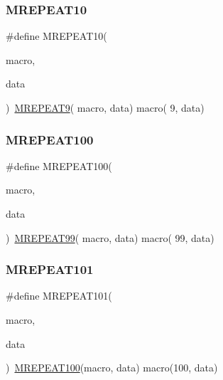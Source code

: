 \mbox{\label{group__group__sam0__utils__mrepeat_gade8cd92280a999cf105148e3fa4c5da9}} 
\subsubsection{\texorpdfstring{MREPEAT10}{MREPEAT10}}
{\footnotesize\ttfamily \#define M\+R\+E\+P\+E\+A\+T10(\begin{DoxyParamCaption}\item[{}]{macro,  }\item[{}]{data }\end{DoxyParamCaption})~\mbox{\hyperlink{group__group__sam0__utils__mrepeat_ga7bd045abdbb4d2c2d1d32e2d65e48b7d}{M\+R\+E\+P\+E\+A\+T9}}(  macro, data)   macro(  9, data)}

\mbox{\label{group__group__sam0__utils__mrepeat_ga2735125552e869ea1e49fa52ed6e175c}} 
\subsubsection{\texorpdfstring{MREPEAT100}{MREPEAT100}}
{\footnotesize\ttfamily \#define M\+R\+E\+P\+E\+A\+T100(\begin{DoxyParamCaption}\item[{}]{macro,  }\item[{}]{data }\end{DoxyParamCaption})~\mbox{\hyperlink{group__group__sam0__utils__mrepeat_ga6f0bcd4130a9efc978ec43537d0ccb57}{M\+R\+E\+P\+E\+A\+T99}}( macro, data)   macro( 99, data)}

\mbox{\label{group__group__sam0__utils__mrepeat_gae02508a50d4516010d562970b2466731}} 
\subsubsection{\texorpdfstring{MREPEAT101}{MREPEAT101}}
{\footnotesize\ttfamily \#define M\+R\+E\+P\+E\+A\+T101(\begin{DoxyParamCaption}\item[{}]{macro,  }\item[{}]{data }\end{DoxyParamCaption})~\mbox{\hyperlink{group__group__sam0__utils__mrepeat_ga2735125552e869ea1e49fa52ed6e175c}{M\+R\+E\+P\+E\+A\+T100}}(macro, data)   macro(100, data)}

